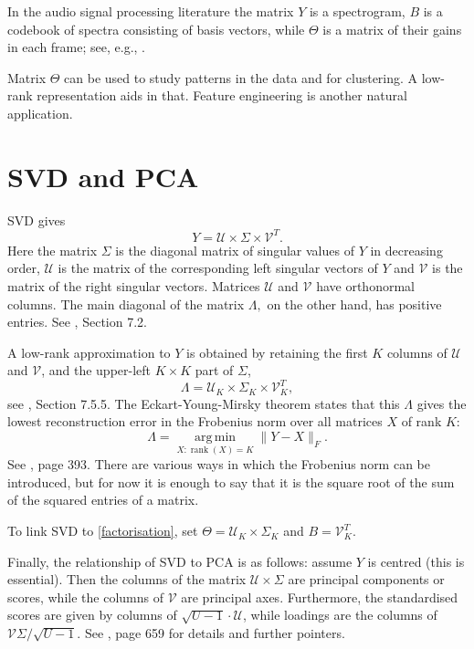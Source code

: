 \documentclass[]{article}
\begin{document}
In the audio signal processing literature the matrix $Y$ is a spectrogram, $B$ is a codebook of spectra consisting of basis vectors, while $\Theta$ is a matrix of their gains in each frame; see, e.g., \citet{virtanen2008}.

Matrix $\Theta$ can be used to study patterns in the data and for clustering. A low-rank representation aids in that. Feature engineering is another natural application.

\section{SVD and PCA}

SVD gives
\[
Y = \mathcal{U} \times \Sigma \times \mathcal{V}^T.
\]
Here the matrix $\Sigma$ is the diagonal matrix of singular values of $Y$ in decreasing order, $\mathcal{U}$ is the matrix of the corresponding left singular vectors of $Y$ and $\mathcal{V}$ is the matrix of the right singular vectors. Matrices $\mathcal{U}$ and $\mathcal{V}$ have orthonormal columns. The main diagonal of the matrix $\Lambda,$ on the other hand, has positive entries. See \citet{strang2000}, Section 7.2.

A low-rank approximation to $Y$ is obtained by retaining the first $K$ columns of $ \mathcal{U}$ and $ \mathcal{V}$, and the upper-left $K \times K$ part of $\Sigma$,
\[
\Lambda =  \mathcal{U}_K \times \Sigma_K \times \mathcal{V}_K^T,
\]
see \citet{murphy2022}, Section 7.5.5. The Eckart-Young-Mirsky theorem states that this $\Lambda$ gives the lowest reconstruction error in the Frobenius norm over all matrices $X$ of rank $K$:
\[
\Lambda = \operatorname*{arg\, min}_{X : \operatorname{rank}(X)=K} \| Y - X \|_F.
\]
See \citet{strang2000}, page 393. There are various ways in which the Frobenius norm can be introduced, but for now it is enough to say that it is the square root of the sum of the squared entries of a matrix.

To link SVD to \eqref{factorisation}, set $\Theta = \mathcal{U}_K \times \Sigma_K$ and $B = \mathcal{V}_K^T.$

Finally, the relationship of SVD to PCA is as follows: assume $Y$ is centred (this is essential). Then the columns of the matrix $\mathcal{U} \times \Sigma$ are principal components or scores, while the columns of $\mathcal{V}$ are principal axes. Furthermore, the standardised scores are given by columns of $\sqrt{U-1} \cdot \mathcal{U}$, while loadings are the columns of $\mathcal{V}\Sigma/\sqrt{U-1}$. See \citet{murphy2022}, page 659 for details and further pointers.
\end{document}
